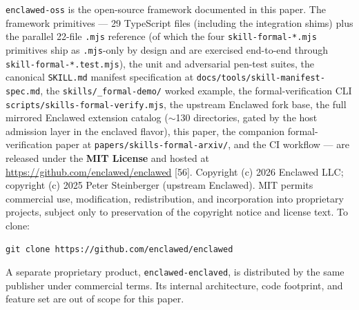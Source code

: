 \documentclass[11pt]{article}
\begin{document}
\texttt{enclawed-oss} is the open-source framework documented in this
paper. The framework primitives --- 29 TypeScript files (including the
integration shims) plus the parallel 22-file \texttt{.mjs} reference
(of which the four \texttt{skill-formal-*.mjs} primitives ship as
\texttt{.mjs}-only by design and are exercised end-to-end through
\texttt{skill-formal-*.test.mjs}), the unit and adversarial
pen-test suites, the canonical \texttt{SKILL.md} manifest specification
at \texttt{docs/tools/skill-manifest-spec.md}, the
\texttt{skills/\_formal-demo/} worked example, the formal-verification
CLI \texttt{scripts/skills-formal-verify.mjs}, the upstream Enclawed
fork base, the full mirrored Enclawed extension catalog (\(\sim\)130
directories, gated by the host admission layer in the enclaved flavor),
this paper, the companion formal-verification paper at
\texttt{papers/skills-formal-arxiv/}, and the CI workflow --- are
released under the \textbf{MIT License} and hosted at
\url{https://github.com/enclawed/enclawed} [56]. Copyright (c)
2026 Enclawed LLC; copyright (c) 2025 Peter Steinberger
(upstream Enclawed). MIT permits commercial use, modification,
redistribution, and incorporation into proprietary projects, subject
only to preservation of the copyright notice and license text. To
clone:
\begin{verbatim}
git clone https://github.com/enclawed/enclawed
\end{verbatim}

A separate proprietary product, \texttt{enclawed-enclaved}, is
distributed by the same publisher under commercial terms. Its
internal architecture, code footprint, and feature set are out of
scope for this paper.
\end{document}
